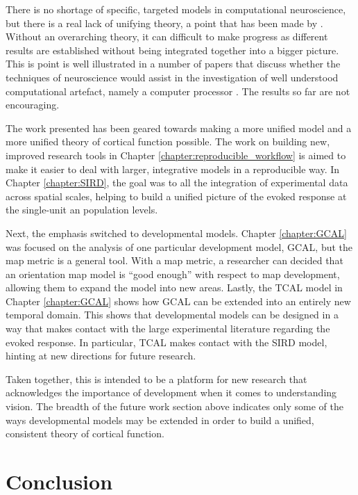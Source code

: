 \documentclass[phd,ianc,twoside]{infthesis}
\begin{document}
There is no shortage of specific, targeted models in computational
neuroscience, but there is a real lack of unifying theory, a point that
has been made by \citet{stevens_nature00}. Without an overarching
theory, it can difficult to make progress as different results are
established without being integrated together into a bigger picture. This is
point is well illustrated in a number of papers that discuss whether the
techniques of neuroscience would assist in the investigation of well
understood computational artefact, namely a computer processor
\citep{brown_frontiers14,jonas_bioRxiv16}. The results so far are not
encouraging.

The work presented has been geared towards making a more unified model
and a more unified theory of cortical function possible. The work on
building new, improved research tools in Chapter
\ref{chapter:reproducible_workflow} is aimed to make it easier to deal
with larger, integrative models in a reproducible way. In Chapter
\ref{chapter:SIRD}, the goal was to all the integration of experimental
data across spatial scales, helping to build a unified picture of the
evoked response at the single-unit an population levels.

Next, the emphasis switched to developmental models. Chapter
\ref{chapter:GCAL} was focused on the analysis of one particular
development model, GCAL, but the map metric is a general tool. With a
map metric, a researcher can decided that an orientation map model is
``good enough'' with respect to map development, allowing them to expand
the model into new areas. Lastly, the TCAL model in Chapter
\ref{chapter:GCAL} shows how GCAL can be extended into an entirely new
temporal domain. This shows that developmental models can be designed in
a way that makes contact with the large experimental literature
regarding the evoked response. In particular, TCAL makes contact with
the SIRD model, hinting at new directions for future research.

Taken together, this is intended to be a platform for new research that
acknowledges the importance of development when it comes to
understanding vision. The breadth of the future work section above
indicates only some of the ways developmental models may be extended in
order to build a unified, consistent theory of cortical function.


\chapter{Conclusion}
\end{document}

